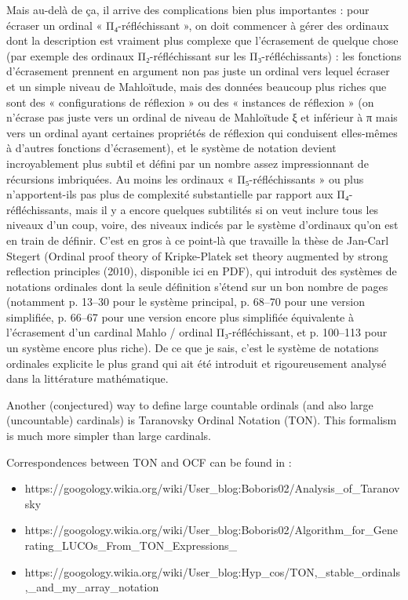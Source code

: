 \documentclass[10pt]{article}
\begin{document}
\begin{changemargin}{1cm}{1cm}
	Mais au-delà de ça, il arrive des complications bien plus importantes : pour écraser un ordinal « Π₄-réfléchissant », on doit commencer à gérer des ordinaux dont la description est vraiment plus complexe que l'écrasement de quelque chose (par exemple des ordinaux Π₂-réfléchissant sur les Π₃-réfléchissants) : les fonctions d'écrasement prennent en argument non pas juste un ordinal vers lequel écraser et un simple niveau de Mahloïtude, mais des données beaucoup plus riches que sont des « configurations de réflexion » ou des « instances de réflexion » (on n'écrase pas juste vers un ordinal de niveau de Mahloïtude ξ et inférieur à π mais vers un ordinal ayant certaines propriétés de réflexion qui conduisent elles-mêmes à d'autres fonctions d'écrasement), et le système de notation devient incroyablement plus subtil et défini par un nombre assez impressionnant de récursions imbriquées. Au moins les ordinaux « Π₅-réfléchissants » ou plus n'apportent-ils pas plus de complexité substantielle par rapport aux Π₄-réfléchissants, mais il y a encore quelques subtilités si on veut inclure tous les niveaux d'un coup, voire, des niveaux indicés par le système d'ordinaux qu'on est en train de définir. C'est en gros à ce point-là que travaille la thèse de Jan-Carl Stegert (Ordinal proof theory of Kripke-Platek set theory augmented by strong reflection principles (2010), disponible ici en PDF), qui introduit des systèmes de notations ordinales dont la seule définition s'étend sur un bon nombre de pages (notamment p. 13–30 pour le système principal, p. 68–70 pour une version simplifiée, p. 66–67 pour une version encore plus simplifiée équivalente à l'écrasement d'un cardinal Mahlo / ordinal Π₃-réfléchissant, et p. 100–113 pour un système encore plus riche). De ce que je sais, c'est le système de notations ordinales explicite le plus grand qui ait été introduit et rigoureusement analysé dans la littérature mathématique.
	
\end{changemargin}
\bigskip
 
 Another (conjectured) way to define large countable ordinals (and also large (uncountable) cardinals) is Taranovsky Ordinal Notation (TON). This formalism is much more simpler than large cardinals. 
 
 Correspondences between TON and OCF can be found in :
 
 \begin{itemize}
  \item https://googology.wikia.org/wiki/User\_blog:Boboris02/Analysis\_of\_Taranovsky%
  \item https://googology.wikia.org/wiki/User\_blog:Boboris02/Algorithm\_for\_Generating\_LUCOs\_From\_TON\_Expressions\_%
  \item https://googology.wikia.org/wiki/User\_blog:Hyp\_cos/TON,\_stable\_ordinals,\_and\_my\_array\_notation
\end{itemize}
\end{document}
